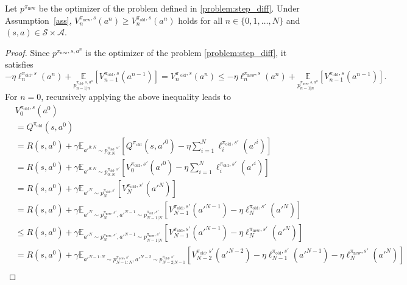 \begin{proposition}\label{proposition:policy_improvement}
Let $p^{\pi_{\textrm{new}}}$ be the optimizer of the problem defined in \eqref{problem:step_diff}. Under Assumption~\ref{ass}, $V^{\pi_{\textrm{new}},s}_n(a^n)\geq V^{\pi_{\textrm{old}},s}_n(a^n)$ holds for all $n\in\{0, 1, \ldots, N\}$ and $(s, a)\in\mathcal{S}\times\mathcal{A}$.
\end{proposition}
\begin{proof}
    Since $p^{\pi_{\textrm{new}}, s, a^n}$ is the optimizer of the problem \ref{problem:step_diff}, it satisfies
    $$
        -\eta\ell^{\pi_{\textrm{old}},s}_n(a^n) + \underset{p^{\pi_{\textrm{old}},s,a^n}_{n-1|n}}{\mathbb{E}}\left[V^{\pi_{\textrm{old}},s}_{n-1}(a^{n-1})\right]=V^{\pi_{\textrm{ old}},s}_{n}(a^{n})\leq -\eta\ell^{\pi_{\textrm{new}},s}_n(a^n) + \underset{p^{\pi_{\textrm{new}},s,a^n}_{n-1|n}}{\mathbb{E}}\left[V^{\pi_{\textrm{old}},s}_{n-1}(a^{n-1})\right].
    $$
    For $n=0$, recursively applying the above inequality leads to
    $$
    \begin{aligned}
        &V_0^{\pi_{\textrm{old}}, s}(a^0) \\
        &= Q^{\pi_{\textrm{old}}}(s, a^0)\\
        &=R(s, a^0)+\gamma\mathbb{E}_{a'^{0:N}\sim p^{\pi_{\textrm{old}},s'}_{0:N}}\left[Q^{\pi_{\textrm{old}}}(s, a'^0)-\eta\sum_{i=1}^N\ell_i^{\pi_{\textrm{old}},s'}(a'^i)\right]\\
        &=R(s, a^0)+\gamma\mathbb{E}_{a'^{0:N}\sim p^{\pi_{\textrm{old}},s'}_{0:N}}\left[V^{\pi_{\textrm{old}},s'}_0(a'^0)-\eta\sum_{i=1}^N\ell_i^{\pi_{\textrm{old}},s'}(a'^i)\right]\\
        &=R(s,a^0)+\gamma\mathbb{E}_{a'^{N}\sim p^{\pi_{\textrm{old}},s'}_{N}}\left[V^{\pi_{\textrm{old}},s'}_N(a'^N)\right]\\
        &= R(s, a^0)+\gamma\mathbb{E}_{a'^N\sim p^{\pi_{\textrm{new}},s'}_N,a'^{N-1}\sim p^{\pi_{\textrm{old}},s'}_{N-1|N}}\left[V^{\pi_{\textrm{old}},s'}_{N-1}(a'^{N-1})-\eta\ell_N^{\pi_{\textrm{old}},s'}(a'^{N})\right]\\
        &\leq R(s, a^0)+\gamma\mathbb{E}_{a'^N\sim p^{\pi_{\textrm{new}},s'}_N,a'^{N-1}\sim p^{\pi_{\textrm{new}},s'}_{N-1|N}}\left[V^{\pi_{\textrm{old}},s'}_{N-1}(a'^{N-1})-\eta\ell_N^{\pi_{\textrm{new}},s'}(a'^{N})\right]\\
        &=R(s, a^0)+\gamma\mathbb{E}_{a'^{N-1:N}\sim p^{\pi_{\textrm{new}},s'}_{N-1:N},a'^{N-2}\sim p^{\pi_{\textrm{old}},s'}_{N-2|N-1}}\left[V^{\pi_{\textrm{old}},s'}_{N-2}(a'^{N-2})-\eta\ell_{N-1}^{\pi_{\textrm{old}},s'}(a'^{N-1})-\eta\ell_N^{\pi_{\textrm{new}},s'}(a'^{N})\right]\\

\end{aligned}$$
\end{proof}
